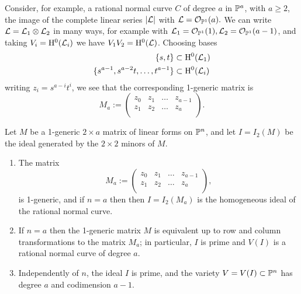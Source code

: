 Consider, for example, a rational normal curve $C$ of degree $a$ in $\PP^a$, with $a\geq 2$, 
the image of the complete linear series $|\cL|$ with $\cL = \cO_{\PP^1}(a).$ 
We can  write $\cL = \cL_1\otimes \cL_2$ in many ways, for example with
$\cL_1 = \cO_{\PP^1}(1), \cL_2 = \cO_{\PP^1}(a-1)$, and taking
$V_i = \HH^0(\cL_i)$ we have $V_1V_2 = \HH^0(\cL)$. Choosing bases
\begin{align*}
\{s,t\} &\subset   \HH^0(\cL_1)\\
\{s^{a-1}, s^{a-2}t, \dots, t^{a-1}\} &\subset \HH^0(\cL_i)\\
\end{align*}
writing $z_i = s^{a-i}t^i$, we see that the corresponding 1-generic matrix is
$$
M_a:= \begin{pmatrix}
 z_0&z_1&\dots&z_{a-1}\\
 z_1&z_2&\dots&z_{a}\\
\end{pmatrix}.
$$


\begin{theorem}Let $M$ be a 1-generic $2\times a$ matrix of linear forms on $\PP^n$, and
let $I = I_2(M)$  be the ideal generated by the $2\times 2$ minors of $M$. 
\begin{enumerate}
\item The matrix
$$
M_a:= \begin{pmatrix}
 z_0&z_1&\dots&z_{a-1}\\
 z_1&z_2&\dots&z_{a}\\
\end{pmatrix},
$$
is 1-generic, and if $n=a$ then
then
$I = I_{2}(M_{a})$ is the homogeneous ideal of the rational
normal curve.

\item If $n = a$ then the 1-generic matrix
$M$ is equivalent up to row and column transformations to the matrix $M_{a}$;
in particular, $I$ is prime and $V(I)$ is a rational normal
curve of degree $a$.

\item Independently of $n$, the ideal $I$ is
prime, and the variety $V = V(I) \subset \PP^n$ has degree $a$ and codimension $a-1$.
\end{enumerate}

\end{theorem}

